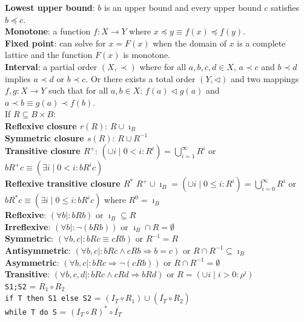 \documentclass[10pt,landscape]{article}
\begin{document}
\begin{multicols}{3}
{\textbf{Lowest upper bound}: $b$ is an upper bound and every upper bound $c$ satisfies $b\preceq c$.\\
\textbf{Monotone}: a function $f:X\rightarrow Y$ where $x\preceq y\equiv f(x)\preceq f(y)$.\\
\textbf{Fixed point}: can solve for $x=F(x)$ when the domain of $x$ is a complete lattice and the function $F(x)$ is monotone. \\
\textbf{Interval}: a partial order $(X,\prec)$ where for all $a,b,c,d\in X$, $a\prec c$ and $b\prec d$ implies $a\prec d$ or $b\prec c$. Or there exists a total order $(Y,\triangleleft)$ and two mappings $f,g: X\rightarrow Y$ such that for all $a,b\in X$: $f(a)\triangleleft g(a)$ and $a\prec b\equiv g(a)\prec f(b)$.\\
If $R\subseteq B\times B$:\\
\textbf{Reflexive closure $r(R)$}: $R\cup \imath_B$\\
\textbf{Symmetric closure $s(R)$}: $R\cup R^{-1}$\\
\textbf{Transitive closure $R^+$}: $(\cup i\mid 0 < i : R^i)=\bigcup^\infty_{i=1}R^i$ or $bR^+c\equiv (\exists i\mid 0 < i : bR^ic)$\\
\textbf{Reflexive transitive closure $R^*$} $R^+\cup \imath_B=(\cup i\mid 0 \leq i : R^i)=\bigcup^\infty_{i=0}R^i$ or $bR^*c\equiv (\exists i \mid 0 \leq i : bR^ic)$ where $R^0=\imath_B$\\
\textbf{Reflexive}: $(\forall b\mid: bR b)$ or $\imath_B\subseteq R$\\
\textbf{Irreflexive}: $(\forall b\mid: \neg (bR b))$ or $\imath_B\cap R=\emptyset$\\
\textbf{Symmetric}: $(\forall b,c\mid: bR c\equiv cR b)$ or $R^{-1}=R$\\
\textbf{Antisymmetric}: $(\forall b,c\mid: bR c\land cR b\Rightarrow b=c)$ or $R \cap R^{-1}\subseteq \imath_B$\\
\textbf{Asymmetric}: $(\forall b,c\mid: bR c\Rightarrow \neg(cR b))$ or $R\cap R^{-1}=\emptyset$\\
\textbf{Transitive}: $(\forall b,c,d\mid: bR c\land cR d\Rightarrow bR d)$ or $R =(\cup i\mid i>0:\rho^\imath)$\\
\texttt{S1;S2} = $R_1\circ R_2$\\
\texttt{if T then S1 else S2} = $(I_T\circ R_1)\cup (\overline{I_T}\circ R_2)$\\
\texttt{while T do S} = $(I_T\circ R)^*\circ\overline{I_T}$
}
\end{multicols}
\end{document}
